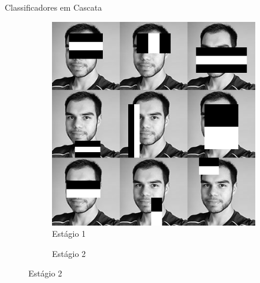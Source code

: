 \begin{frame}{Classificadores em Cascata}
\begin{figure}[htbp]
    \label{fig:julio_cascade}
    \begin{subfigure}[t]{0.24\textwidth}
    \centering
    \caption{Estágio 1}
    \includegraphics[height=0.6\textheight,width=\textwidth,keepaspectratio]{imagens/cascata_estagio_01.png}
    \end{subfigure}
    \begin{subfigure}[t]{0.24\textwidth}
    \centering
    \caption{Estágio 2}

\end{subfigure}
\end{figure}
\end{frame}
